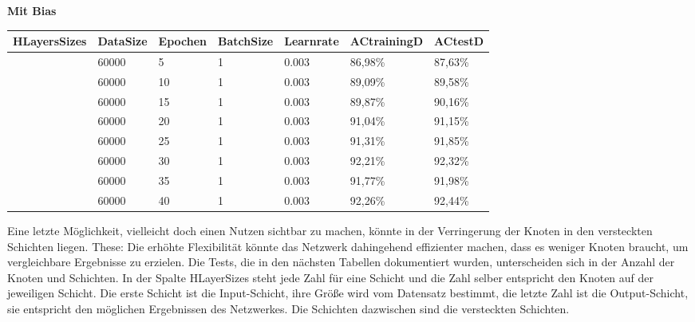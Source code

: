 \documentclass[12pt]{article}
\begin{document}
\begin{table}[H]
    \centering
    \textbf{Mit Bias}
    \begin{tabular}{|l|l|l|l|l|l|l|}
    \hline
        HLayersSizes & DataSize & Epochen & BatchSize & Learnrate & ACtrainingD & ACtestD \\ \hline
        [784, 100, 10] & 60000 & 5 & 1 & 0.003 & 86,98\% & 87,63\% \\ \hline
        [784, 100, 10] & 60000 & 10 & 1 & 0.003 & 89,09\% & 89,58\% \\ \hline
        [784, 100, 10] & 60000 & 15 & 1 & 0.003 & 89,87\% & 90,16\% \\ \hline
        [784, 100, 10] & 60000 & 20 & 1 & 0.003 & 91,04\% & 91,15\% \\ \hline
        [784, 100, 10] & 60000 & 25 & 1 & 0.003 & 91,31\% & 91,85\% \\ \hline
        [784, 100, 10] & 60000 & 30 & 1 & 0.003 & 92,21\% & 92,32\% \\ \hline
        [784, 100, 10] & 60000 & 35 & 1 & 0.003 & 91,77\% & 91,98\% \\ \hline
        [784, 100, 10] & 60000 & 40 & 1 & 0.003 & 92,26\% & 92,44\% \\ \hline
    \end{tabular}
\end{table}
Eine letzte Möglichkeit, vielleicht doch einen Nutzen sichtbar zu machen, könnte in der Verringerung der Knoten in den versteckten Schichten liegen. 
These: Die erhöhte Flexibilität könnte das Netzwerk dahingehend effizienter machen, dass es weniger Knoten braucht, um vergleichbare Ergebnisse zu erzielen.
Die Tests, die in den nächsten Tabellen dokumentiert wurden, unterscheiden sich in der Anzahl der Knoten und Schichten. In der Spalte HLayerSizes steht jede Zahl für eine Schicht und die Zahl selber entspricht den Knoten auf der jeweiligen Schicht. Die erste Schicht ist die Input-Schicht, ihre Größe wird vom Datensatz bestimmt, die letzte Zahl ist die Output-Schicht, sie entspricht den möglichen Ergebnissen des Netzwerkes. Die Schichten dazwischen sind die versteckten Schichten.
\end{document}
